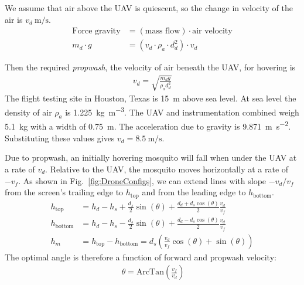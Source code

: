 We assume that air above the UAV is quiescent, so the change in velocity of the air is $v_d~ \si{\metre\per\second}$.
\begin{align} \label{eq:forceBalanceForDrone}
\text{Force gravity} & = \left(\text{mass flow}\right) \cdot \text{air velocity} \nonumber \\
m_{d} \cdot  g &= (v_d \cdot  \rho_a \cdot  d_d^2 ) \cdot  v_d 
\end{align}

Then the required \emph{propwash}, the velocity of air beneath the UAV, for hovering is
\begin{align} \label{eq:dronePropwash}
v_d = \sqrt{ \frac{ m_d g}{\rho_a d_d^2} }
\end{align}
The flight testing site in Houston, Texas is \SI{15}{\metre} above sea level. At sea level the density of air $\rho_a$ is \SI{1.225}{\kilogram\per\cubic\metre}.
The UAV and instrumentation combined weigh \SI{5.1}{\kilogram} with a width of \SI{0.75}{\metre}. The acceleration due to gravity is \SI{9.871}{\metre\per\square\second}.  Substituting these values gives $v_d = \SI{8.5}{\metre\per\second}$.

Due to propwash, an initially hovering mosquito will fall when under the UAV at a rate of $v_d$.  Relative to the UAV, the mosquito moves horizontally at a rate of $-v_f$.  As shown in Fig.~\ref{fig:DroneConfigs}, we can extend lines with slope $-v_d/v_f$ from the screen's trailing edge to $h_{\textrm{top}}$ and from the leading edge to $h_{\textrm{bottom}}$.
\begin{align} \label{eq:ClearedCrossSection}
h_{\textrm{top}} &= h_d - h_s + \frac{d_s}{2} \sin(\theta) +  \frac{d_d + d_s\cos(\theta)}{2}  \frac{v_d}{v_f} \nonumber \\
h_{\textrm{bottom}} &= h_d - h_s - \frac{d_s}{2} \sin(\theta) +  \frac{d_d - d_s\cos(\theta)}{2}  \frac{v_d}{v_f}  \nonumber \\
h_m &= h_{\textrm{top}} - h_{\textrm{bottom}} =  d_s\left(\frac{v_d}{v_f}\cos(\theta) + \sin(\theta) \right)
\end{align}
The optimal angle is therefore a function of forward and propwash velocity:
\begin{align} \label{eq:OptimalScreenAngle}
\ \theta = \mathrm{ArcTan}\left(\frac{v_f}{v_d}\right)
\end{align}

